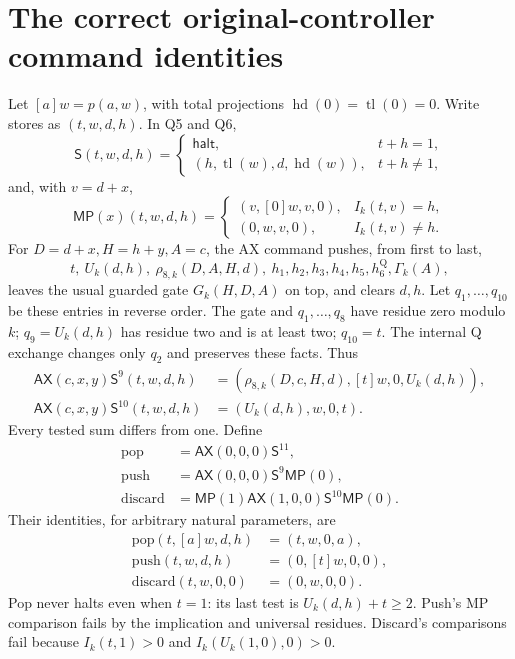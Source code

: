\documentclass[11pt]{article}
\newcommand{\AX}{\mathsf{AX}}
\newcommand{\MP}{\mathsf{MP}}
\newcommand{\Sh}{\mathsf S}
\begin{document}
\section{The correct original-controller command identities}
Let $[a]w=p(a,w)$, with total projections
$\operatorname{hd}(0)=\operatorname{tl}(0)=0$. Write stores as
$(t,w,d,h)$. In Q5 and Q6,
\[
 \Sh(t,w,d,h)=
 \begin{cases}
  \mathsf{halt},&t+h=1,\\
  (h,\operatorname{tl}(w),d,\operatorname{hd}(w)),&t+h\ne1,
 \end{cases}
\]
and, with $v=d+x$,
\[
 \MP(x)(t,w,d,h)=
 \begin{cases}
   (v,[0]w,v,0),&I_k(t,v)=h,\\
   (0,w,v,0),&I_k(t,v)\ne h.
 \end{cases}                                                    \tag{4}
\]
For $D=d+x,H=h+y,A=c$, the AX command pushes, from first to last,
\[
 t,\ U_k(d,h),\ \rho_{8,k}(D,A,H,d),\ h_1,h_2,h_3,h_4,h_5,
 h_6^{\mathrm Q},\Gamma_k(A),
\]
leaves the usual guarded gate $G_k(H,D,A)$ on top, and clears $d,h$.
Let $q_1,\ldots,q_{10}$ be these entries in reverse order. The gate
and $q_1,\ldots,q_8$ have residue zero modulo $k$;
$q_9=U_k(d,h)$ has residue two and is at least two; $q_{10}=t$.
The internal Q exchange changes only $q_2$ and preserves these facts.
Thus
\[
\begin{aligned}
 \AX(c,x,y)\Sh^9(t,w,d,h)
   &=(\rho_{8,k}(D,c,H,d),[t]w,0,U_k(d,h)),\\
 \AX(c,x,y)\Sh^{10}(t,w,d,h)&=(U_k(d,h),w,0,t).
\end{aligned}                                                    \tag{5}
\]
Every tested sum differs from one. Define
\[
\begin{aligned}
 \mathrm{pop}&=\AX(0,0,0)\Sh^{11},\\
 \mathrm{push}&=\AX(0,0,0)\Sh^9\MP(0),\\
 \mathrm{discard}&=\MP(1)\AX(1,0,0)\Sh^{10}\MP(0).
\end{aligned}
\]
Their identities, for arbitrary natural parameters, are
\[
\begin{aligned}
 \mathrm{pop}(t,[a]w,d,h)&=(t,w,0,a),\\
 \mathrm{push}(t,w,d,h)&=(0,[t]w,0,0),\\
 \mathrm{discard}(t,w,0,0)&=(0,w,0,0).
\end{aligned}                                                    \tag{6}
\]
Pop never halts even when $t=1$: its last test is
$U_k(d,h)+t\ge2$. Push's MP comparison fails by the implication and
universal residues. Discard's comparisons fail because $I_k(t,1)>0$
and $I_k(U_k(1,0),0)>0$.
\end{document}
